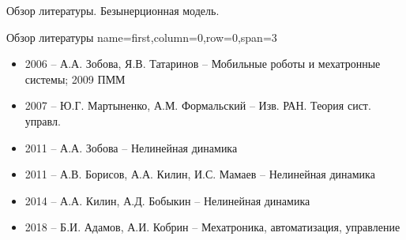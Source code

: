 \begin{myposter}{
    Обзор литературы. Безынерционная модель.
}

    \headerbox
    {Обзор литературы}
    {name=first,column=0,row=0,span=3}
    {
        {\huge\bf
            \begin{itemize}
                \item 2006 -- А.А. Зобова, Я.В. Татаринов -- Мобильные роботы и мехатронные системы; 2009 ПММ
                \item 2007 -- Ю.Г. Мартыненко, А.М. Формальский -- Изв. РАН. Теория сист. управл.
                \item 2011 -- А.А. Зобова -- Нелинейная динамика
                \item 2011 -- А.В. Борисов, А.А. Килин, И.С. Мамаев -- Нелинейная динамика
                \item 2014 -- А.А. Килин, А.Д. Бобыкин -- Нелинейная динамика
                \item 2018 -- Б.И. Адамов, А.И. Кобрин -- Мехатроника, автоматизация, управление
            \end{itemize}
        }
    }
    

\end{myposter}
